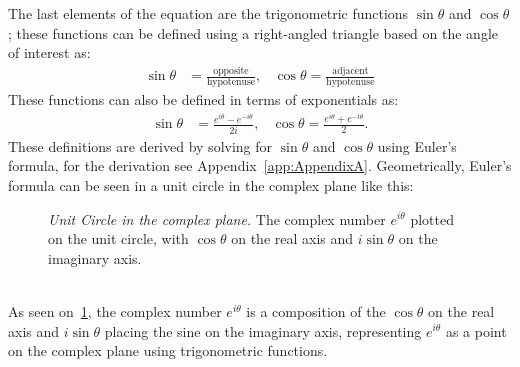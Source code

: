 \documentclass[12pt,a4paper]{article}
\begin{document}
The last elements of the equation are the trigonometric functions $\sin{\theta}$ and $\cos{\theta}$; these functions can be defined using a right-angled triangle based on the angle of interest as:
\begin{align}
\sin{\theta} &= \frac{\text{opposite}}{\text{hypotenuse}}, & \cos{\theta} = \frac{\text{adjacent}}{\text{hypotenuse}}
\end{align}
These functions can also be defined in terms of exponentials as:
\begin{align}
\sin{\theta} &= \frac{e^{i\theta}-e^{-i\theta}}{2i}, & \cos{\theta} = \frac{e^{i\theta}+e^{-i\theta}}{2}.
\end{align}
These definitions are derived by solving for $\sin{\theta}$ and $\cos{\theta}$ using Euler's formula, for the derivation see Appendix~\ref{app:AppendixA}. Geometrically, Euler's formula can be seen in a unit circle in the complex plane like this:
\begin{figure}[ht]
\begin{center}
\end{center}\caption{\textit{Unit Circle in the complex plane.} The complex number $e^{i\theta}$ plotted on the unit circle, with $\cos{\theta}$ on the real axis and $i\sin{\theta}$ on the imaginary axis.}\label{fig:UnitCircle}
\end{figure}\\
As seen on~\cref{fig:UnitCircle}, the complex number $e^{i\theta}$ is a composition of the $\cos{\theta}$ on the real axis and $i\sin{\theta}$ placing the sine on the imaginary axis, representing $e^{i\theta}$ as a point on the complex plane using trigonometric functions.
\end{document}
